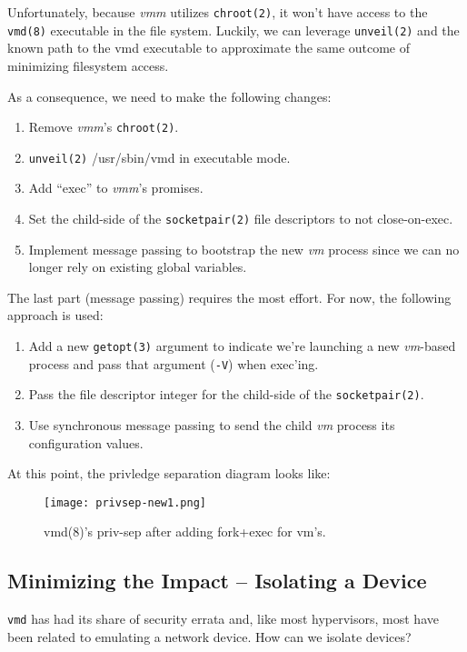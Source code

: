 \documentclass[conference]{IEEEtran}
\begin{document}
Unfortunately, because \emph{vmm} utilizes \texttt{chroot(2)}, it
won't have access to the \texttt{vmd(8)} executable in the file
system. Luckily, we can leverage \texttt{unveil(2)} and the known path
to the vmd executable to approximate the same outcome of minimizing
filesystem access.

As a consequence, we need to make the following changes:

\vspace{2mm}
\begin{enumerate}
\item Remove \emph{vmm}'s \texttt{chroot(2)}.
\item \texttt{unveil(2)} /usr/sbin/vmd in executable mode.
\item Add ``exec'' to \emph{vmm}'s promises.
\item Set the child-side of the \texttt{socketpair(2)} file
  descriptors to not close-on-exec.
\item Implement message passing to bootstrap the new \emph{vm} process
  since we can no longer rely on existing global variables.
\end{enumerate}
\vspace{2mm}

The last part (message passing) requires the most effort. For now, the
following approach is used:

\vspace{2mm}
\begin{enumerate}
\item Add a new \texttt{getopt(3)} argument to indicate we're
  launching a new \emph{vm}-based process and pass that argument
  (\texttt{-V}) when exec'ing.
\item Pass the file descriptor integer for the child-side of the
  \texttt{socketpair(2)}.
\item Use synchronous message passing to send the child \emph{vm}
  process its configuration values.
\end{enumerate}
\vspace{2mm}

At this point, the privledge separation diagram looks like:

\begin{figure}
  \texttt{[image: privsep-new1.png]}
  \caption{vmd(8)'s priv-sep after adding fork+exec for vm's.}
\end{figure}


\vspace{3mm}
\subsection{Minimizing the Impact -- Isolating a Device}
\texttt{vmd} has had its share of security errata and, like most
hypervisors, most have been related to emulating a network device. How
can we isolate devices?
\end{document}
